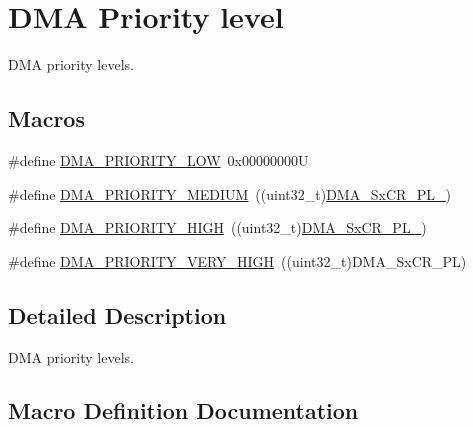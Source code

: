\hypertarget{group___d_m_a___priority__level}{}\section{D\+MA Priority level}
\label{group___d_m_a___priority__level}


D\+MA priority levels.  


\subsection*{Macros}
\begin{DoxyCompactItemize}
\item 
\#define \mbox{\hyperlink{group___d_m_a___priority__level_ga0d1ed2bc9229ba3c953002bcf3a72130}{D\+M\+A\+\_\+\+P\+R\+I\+O\+R\+I\+T\+Y\+\_\+\+L\+OW}}~0x00000000U
\item 
\#define \mbox{\hyperlink{group___d_m_a___priority__level_gad6fbeee76fd4a02cbed64365bb4c1781}{D\+M\+A\+\_\+\+P\+R\+I\+O\+R\+I\+T\+Y\+\_\+\+M\+E\+D\+I\+UM}}~((uint32\+\_\+t)\mbox{\hyperlink{group___peripheral___registers___bits___definition_ga41b1b2f7bd6f0af932ff0fb7df9336b6}{D\+M\+A\+\_\+\+Sx\+C\+R\+\_\+\+P\+L\+\_}})
\item 
\#define \mbox{\hyperlink{group___d_m_a___priority__level_ga6b2f5c5e22895f8b4bd52a27ec6cae2a}{D\+M\+A\+\_\+\+P\+R\+I\+O\+R\+I\+T\+Y\+\_\+\+H\+I\+GH}}~((uint32\+\_\+t)\mbox{\hyperlink{group___peripheral___registers___bits___definition_ga81817adc8c0ee54dea0f67a1a9e8eb77}{D\+M\+A\+\_\+\+Sx\+C\+R\+\_\+\+P\+L\+\_}})
\item 
\#define \mbox{\hyperlink{group___d_m_a___priority__level_gaed0542331a4d875d1d8d5b2878e9372c}{D\+M\+A\+\_\+\+P\+R\+I\+O\+R\+I\+T\+Y\+\_\+\+V\+E\+R\+Y\+\_\+\+H\+I\+GH}}~((uint32\+\_\+t)D\+M\+A\+\_\+\+Sx\+C\+R\+\_\+\+PL)
\end{DoxyCompactItemize}


\subsection{Detailed Description}
D\+MA priority levels. 



\subsection{Macro Definition Documentation}
\mbox{\label{group___d_m_a___priority__level_ga6b2f5c5e22895f8b4bd52a27ec6cae2a}} 
